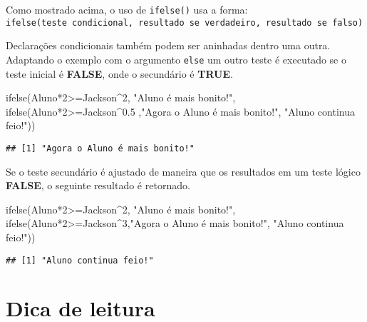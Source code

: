 \documentclass[
]{book}
\newenvironment{Shaded}{\begin{snugshade}}{\end{snugshade}}
\newcommand{\DecValTok}[1]{\textcolor[rgb]{0.00,0.00,0.81}{#1}}
\newcommand{\FloatTok}[1]{\textcolor[rgb]{0.00,0.00,0.81}{#1}}
\newcommand{\FunctionTok}[1]{\textcolor[rgb]{0.00,0.00,0.00}{#1}}
\newcommand{\NormalTok}[1]{#1}
\newcommand{\SpecialCharTok}[1]{\textcolor[rgb]{0.00,0.00,0.00}{#1}}
\newcommand{\StringTok}[1]{\textcolor[rgb]{0.31,0.60,0.02}{#1}}
\begin{document}
Como mostrado acima, o uso de \texttt{ifelse()} usa a forma:
\texttt{ifelse(teste\ condicional,\ resultado\ se\ verdadeiro,\ resultado\ se\ falso)}

Declarações condicionais também podem ser aninhadas dentro uma outra. Adaptando o exemplo com o argumento \texttt{else} um outro teste é executado se o teste inicial é \textbf{FALSE}, onde o secundário é \textbf{TRUE}.

\begin{Shaded}
\begin{Highlighting}[]
\FunctionTok{ifelse}\NormalTok{(Aluno}\SpecialCharTok{*}\DecValTok{2}\SpecialCharTok{\textgreater{}=}\NormalTok{Jackson}\SpecialCharTok{\^{}}\DecValTok{2}\NormalTok{, }\StringTok{"Aluno é mais bonito!"}\NormalTok{,}
       \FunctionTok{ifelse}\NormalTok{(Aluno}\SpecialCharTok{*}\DecValTok{2}\SpecialCharTok{\textgreater{}=}\NormalTok{Jackson}\SpecialCharTok{\^{}}\FloatTok{0.5}\NormalTok{ ,}\StringTok{"Agora o Aluno é mais bonito!"}\NormalTok{, }\StringTok{"Aluno continua feio!"}\NormalTok{))}
\end{Highlighting}
\end{Shaded}

\begin{verbatim}
## [1] "Agora o Aluno é mais bonito!"
\end{verbatim}

Se o teste secundário é ajustado de maneira que os resultados em um teste lógico \textbf{FALSE}, o seguinte resultado é retornado.

\begin{Shaded}
\begin{Highlighting}[]
\FunctionTok{ifelse}\NormalTok{(Aluno}\SpecialCharTok{*}\DecValTok{2}\SpecialCharTok{\textgreater{}=}\NormalTok{Jackson}\SpecialCharTok{\^{}}\DecValTok{2}\NormalTok{, }\StringTok{"Aluno é mais bonito!"}\NormalTok{,}
       \FunctionTok{ifelse}\NormalTok{(Aluno}\SpecialCharTok{*}\DecValTok{2}\SpecialCharTok{\textgreater{}=}\NormalTok{Jackson}\SpecialCharTok{\^{}}\DecValTok{3}\NormalTok{,}\StringTok{"Agora o Aluno é mais bonito!"}\NormalTok{, }\StringTok{"Aluno continua feio!"}\NormalTok{))}
\end{Highlighting}
\end{Shaded}

\begin{verbatim}
## [1] "Aluno continua feio!"
\end{verbatim}

\hypertarget{dica-de-leitura}{%
\section{Dica de leitura}\label{dica-de-leitura}}
\end{document}
